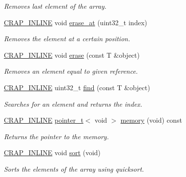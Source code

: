 \begin{DoxyCompactItemize}
\begin{DoxyCompactList}\small\item\em Removes last element of the array. \end{DoxyCompactList}\item 
\hyperlink{config__x86_8h_a5a40526b8d842e7ff731509998bb0f1c}{C\+R\+A\+P\+\_\+\+I\+N\+L\+I\+N\+E} void \hyperlink{classcrap_1_1array_ae0ac64a23e023c74e9765947d4c69560}{erase\+\_\+at} (uint32\+\_\+t index)
\begin{DoxyCompactList}\small\item\em Removes the element at a certain position. \end{DoxyCompactList}\item 
\hyperlink{config__x86_8h_a5a40526b8d842e7ff731509998bb0f1c}{C\+R\+A\+P\+\_\+\+I\+N\+L\+I\+N\+E} void \hyperlink{classcrap_1_1array_a34f587e9a5445845ae9a6802fa00fcee}{erase} (const T \&object)
\begin{DoxyCompactList}\small\item\em Removes an element equal to given reference. \end{DoxyCompactList}\item 
\hyperlink{config__x86_8h_a5a40526b8d842e7ff731509998bb0f1c}{C\+R\+A\+P\+\_\+\+I\+N\+L\+I\+N\+E} uint32\+\_\+t \hyperlink{classcrap_1_1array_a519c451e83aaae87fb21b9e6905f2235}{find} (const T \&object)
\begin{DoxyCompactList}\small\item\em Searches for an element and returns the index. \end{DoxyCompactList}\item 
\hyperlink{config__x86_8h_a5a40526b8d842e7ff731509998bb0f1c}{C\+R\+A\+P\+\_\+\+I\+N\+L\+I\+N\+E} \hyperlink{structcrap_1_1pointer__t}{pointer\+\_\+t}$<$ void $>$ \hyperlink{classcrap_1_1array_a7c1234696095b2e05343c9670c5a6ecd}{memory} (void) const 
\begin{DoxyCompactList}\small\item\em Returns the pointer to the memory. \end{DoxyCompactList}\item 
\hyperlink{config__x86_8h_a5a40526b8d842e7ff731509998bb0f1c}{C\+R\+A\+P\+\_\+\+I\+N\+L\+I\+N\+E} void \hyperlink{classcrap_1_1array_a6d0dce186d942103d3ee73773fda560d}{sort} (void)
\begin{DoxyCompactList}\small\item\em Sorts the elements of the array using quicksort. \end{DoxyCompactList}\end{DoxyCompactItemize}
